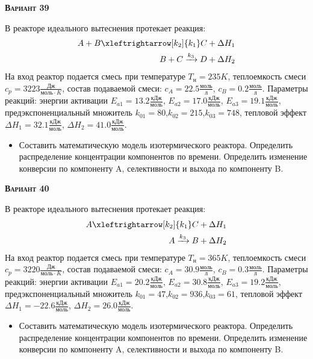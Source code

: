 \textsc{\textbf{Вариант 39}}

 В реакторе идеального вытеснения протекает реакция: \begin{equation*} \begin{aligned} A+B \xleftrightarrow[k_2]{k_1} C + \Delta H_1 \\ B + C \xrightarrow{k_3} D + \Delta H_2 \end{aligned} \end{equation*}                        На вход  реактор подается смесь при температуре $ T_{н} =  235 K$, теплоемкость смеси $c_p= 3223 \frac{Дж}{моль \cdot K}$, состав подаваемой смеси: $c_A=22.5 \frac{моль}{л}$, $c_B=0.2 \frac{моль}{л}$. Параметры реакций: энергии активации $E_{a1}=13.2 \frac{кДж}{моль}$, $E_{a2}=17.0  \frac{кДж}{моль}$, $E_{a3}=19.1  \frac{кДж}{моль}$, предэкспоненциальный множитель $k_{01}=        80$,$k_{02}=       215$,$k_{03}=       748$, тепловой эффект $\Delta H_1= 32.1  \frac{кДж}{моль}$, $\Delta H_2=41.0 \frac{кДж}{моль}$.\begin{itemize} \item Составить математическую модель изотермического реактора. Определить распределение концентрации компонентов по времени. Определить изменение конверсии по компоненту A, селективности и выхода по компоненту B. \end{itemize}

\textsc{\textbf{Вариант 40}}

 В реакторе идеального вытеснения протекает реакция: \begin{equation*} \begin{aligned} A \xleftrightarrow[k_2]{k_1} C + \Delta H_1 \\ A \xrightarrow{k_3} B + \Delta H_2 \end{aligned} \end{equation*}                              На вход  реактор подается смесь при температуре $ T_{н} =  365 K$, теплоемкость смеси $c_p= 3220 \frac{Дж}{моль \cdot K}$, состав подаваемой смеси: $c_A=30.9 \frac{моль}{л}$, $c_B=0.3 \frac{моль}{л}$. Параметры реакций: энергии активации $E_{a1}=20.2 \frac{кДж}{моль}$, $E_{a2}=30.8  \frac{кДж}{моль}$, $E_{a3}=19.2  \frac{кДж}{моль}$, предэкспоненциальный множитель $k_{01}=        47$,$k_{02}=       936$,$k_{03}=        61$, тепловой эффект $\Delta H_1= -22.6  \frac{кДж}{моль}$, $\Delta H_2=26.0 \frac{кДж}{моль}$.\begin{itemize} \item Составить математическую модель изотермического реактора. Определить распределение концентрации компонентов по времени. Определить изменение конверсии по компоненту A, селективности и выхода по компоненту B. \end{itemize}


